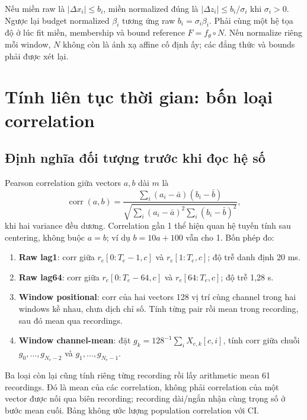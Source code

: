 \documentclass[11pt,a4paper]{article}
\theoremstyle{definition}
\begin{document}
Nếu miền raw là $|\Delta x_i|\le b_i$, miền normalized đúng là
$|\Delta z_i|\le b_i/\sigma_i$ khi $\sigma_i>0$. Ngược lại budget
normalized $\beta_i$ tương ứng raw $b_i=\sigma_i\beta_i$. Phải cùng một
hệ tọa độ ở lúc fit miền, membership và bound reference $F=f_\theta\circ N$.
Nếu normalize riêng mỗi window, $N$ không còn là ánh xạ affine cố định ấy;
các đẳng thức và bounds phải được xét lại.

\section{Tính liên tục thời gian: bốn loại correlation}
\subsection{Định nghĩa đối tượng trước khi đọc hệ số}
Pearson correlation giữa vectors $a,b$ dài $m$ là
\begin{equation}
\operatorname{corr}(a,b)=\frac{\sum_i(a_i-\bar a)(b_i-\bar b)}
{\sqrt{\sum_i(a_i-\bar a)^2\sum_i(b_i-\bar b)^2}},
\end{equation}
khi hai variance đều dương. Correlation gần 1 thể hiện quan hệ tuyến tính
sau centering, không buộc $a=b$; ví dụ $b=10a+100$ vẫn cho 1. Bốn phép đo:
\begin{enumerate}
\item \textbf{Raw lag1}: corr giữa $r_e[0:T_e-1,c]$ và $r_e[1:T_e,c]$;
độ trễ danh định 20 ms.
\item \textbf{Raw lag64}: corr giữa $r_e[0:T_e-64,c]$ và
$r_e[64:T_e,c]$; độ trễ 1,28 s.
\item \textbf{Window positional}: corr của hai vectors 128 vị trí cùng
channel trong hai windows kề nhau, chưa dịch chỉ số. Tính từng pair rồi
mean trong recording, sau đó mean qua recordings.
\item \textbf{Window channel-mean}: đặt $g_k=128^{-1}\sum_iX_{e,k}[c,i]$,
tính corr giữa chuỗi $g_0,\ldots,g_{N_e-2}$ và $g_1,\ldots,g_{N_e-1}$.
\end{enumerate}
Ba loại còn lại cũng tính riêng từng recording rồi lấy arithmetic mean
61 recordings. Đó là mean của các correlation, không phải correlation của
một vector được nối qua biên recording; recording dài/ngắn nhận cùng trọng
số ở bước mean cuối. Bảng không ước lượng population correlation với CI.
\end{document}
